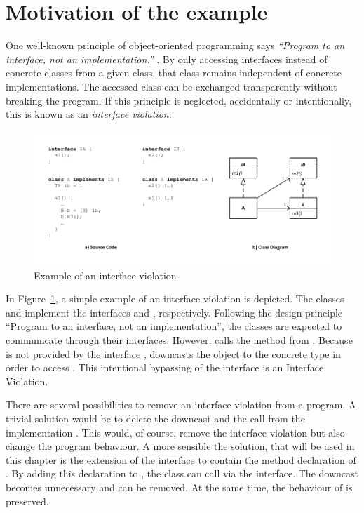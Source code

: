 \section{Motivation of the example}

One well-known principle of object-oriented programming says \emph{``Program to an interface, not an implementation.''} \cite{GHJV95}. By only accessing interfaces instead of concrete classes from a given class, that class remains independent of concrete implementations. The accessed class can be exchanged transparently without breaking the program. If this principle is neglected, accidentally or intentionally, this is known as an \emph{interface violation}.

\begin{figure}[hbtp]
\centering
\includegraphics[width=\linewidth]{./figures/InterfaceViolation}
\caption{Example of an interface violation}
\label{fig:InterfaceViolationExample}
\end{figure}

In Figure~\ref{fig:InterfaceViolationExample}, a simple example of an interface violation is depicted. The classes  and  implement the interfaces  and , respectively. Following the design principle ``Program to an interface, not an implementation'', the classes are expected to communicate through their interfaces. However,  calls the method  from . Because  is not provided by the interface ,  downcasts the object  to the concrete type  in order to access . This intentional bypassing of the interface  is an Interface Violation.

There are several possibilities to remove an interface violation from a program. A trivial solution would be to delete the downcast and the call from the implementation . This would, of course, remove the interface violation but also change the program behaviour. A more sensible the solution, that will be used in this chapter is the extension of the interface  to contain the method declaration of . By adding this declaration to , the class  can call  via the interface. The downcast becomes unnecessary and can be removed. At the same time, the behaviour of  is preserved.

